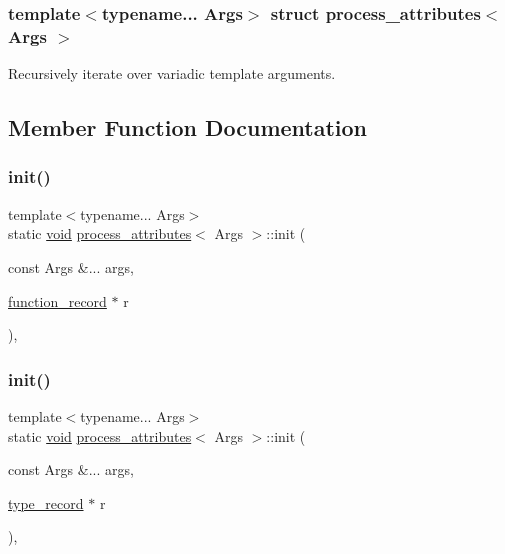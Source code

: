 \subsubsection*{template$<$typename... Args$>$\newline
struct process\+\_\+attributes$<$ Args $>$}

Recursively iterate over variadic template arguments. 

\subsection{Member Function Documentation}
\mbox{\label{structprocess__attributes_a27a45881631e93c2f3a126f8bd661a77}} 
\subsubsection{\texorpdfstring{init()}{init()}\hspace{0.1cm}{\footnotesize\ttfamily [1/2]}}
{\footnotesize\ttfamily template$<$typename... Args$>$ \\
static \mbox{\hyperlink{_s_d_l__opengles2__gl2ext_8h_ae5d8fa23ad07c48bb609509eae494c95}{void}} \mbox{\hyperlink{structprocess__attributes}{process\+\_\+attributes}}$<$ Args $>$\+::init (\begin{DoxyParamCaption}\item[{const Args \&...}]{args,  }\item[{\mbox{\hyperlink{structfunction__record}{function\+\_\+record}} $\ast$}]{r }\end{DoxyParamCaption})\hspace{0.3cm}{\ttfamily [inline]}, {\ttfamily [static]}}

\mbox{\label{structprocess__attributes_aaaf6a28124bd149eb824da439e173714}} 
\subsubsection{\texorpdfstring{init()}{init()}\hspace{0.1cm}{\footnotesize\ttfamily [2/2]}}
{\footnotesize\ttfamily template$<$typename... Args$>$ \\
static \mbox{\hyperlink{_s_d_l__opengles2__gl2ext_8h_ae5d8fa23ad07c48bb609509eae494c95}{void}} \mbox{\hyperlink{structprocess__attributes}{process\+\_\+attributes}}$<$ Args $>$\+::init (\begin{DoxyParamCaption}\item[{const Args \&...}]{args,  }\item[{\mbox{\hyperlink{structtype__record}{type\+\_\+record}} $\ast$}]{r }\end{DoxyParamCaption})\hspace{0.3cm}{\ttfamily [inline]}, {\ttfamily [static]}}

